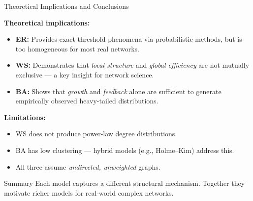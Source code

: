 \documentclass[t]{beamer}
\begin{document}
\begin{frame}{Theoretical Implications and Conclusions}
\footnotesize

\textbf{Theoretical implications:}
\begin{itemize}
  \item \textbf{ER:} Provides exact threshold phenomena via probabilistic methods,
        but is too homogeneous for most real networks.
  \item \textbf{WS:} Demonstrates that \emph{local structure} and \emph{global efficiency}
        are not mutually exclusive — a key insight for network science.
  \item \textbf{BA:} Shows that \emph{growth} and \emph{feedback} alone are sufficient
        to generate empirically observed heavy-tailed distributions.
\end{itemize}

\smallskip

\textbf{Limitations:}
\begin{itemize}
  \item WS does not produce power-law degree distributions.
  \item BA has low clustering — hybrid models (e.g., Holme--Kim) address this.
  \item All three assume \emph{undirected, unweighted} graphs.
\end{itemize}

\smallskip

\begin{block}{Summary}
  Each model captures a different structural mechanism.
  Together they motivate richer models for real-world complex networks.
\end{block}

\end{frame}

\end{document}
